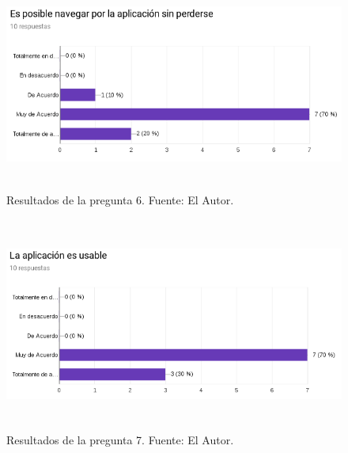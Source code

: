 \begin{figure}[H]
\begin{center}
	\includegraphics[width=\textwidth,height=7cm]{img/encuestas/navegar_sin_perdida.png}
\end{center}
\caption{Resultados de la pregunta 6. Fuente: El Autor.}
\label{fig:respuesta_navegar_sin_perdida}
\end{figure}
\newpage
\begin{figure}[H]
\begin{center}
	\includegraphics[width=\textwidth,height=7cm]{img/encuestas/aplicacion_usable.png}
\end{center}
\caption{Resultados de la pregunta 7. Fuente: El Autor.}
\label{fig:respuesta_aplicacion_usable}
\end{figure}

